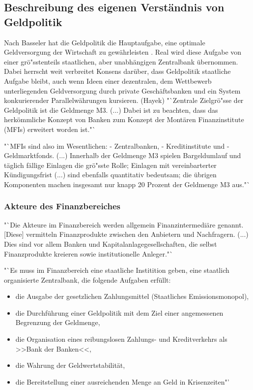 \documentclass[
        onecolumn,
        a4paper,
        abstracton,
        parskip=half
        ,final
        ]{scrartcl}
\begin{document}
\subsection{Beschreibung des eigenen Verst{\"a}ndnis von Geldpolitik}

    Nach Basseler hat die Geldpolitik die Hauptaufgabe, eine optimale Geldversorgung der Wirtschaft zu gew{\"a}hrleisten \citep[Vgl.][S. 551]{Basseler2010}.
    Real wird diese Aufgabe von einer gr{\"o}{"ss}tenteils staatlichen, aber unabh{\"a}ngigen Zentralbank {\"u}bernommen. Dabei herrscht weit verbreitet Konsens dar{\"u}ber, dass Geldpolitik staatliche Aufgabe bleibt, auch wenn Ideen einer dezentralen, dem Wettbewerb unterliegenden Geldversorgung durch private Gesch{\"a}ftsbanken und ein System konkurierender Parallelw{\"a}hrungen kursieren. (Hayek)
    "`Zentrale Zielgr{\"o}{"ss}e der Geldpolitik ist die Geldmenge M3. (...) Dabei ist zu beachten, dass das herk{\"o}mmliche Konzept von Banken zum Konzept der Mont{\"a}ren Finanzinstitute (MFIs) erweitert worden ist."`
    \citep[vgl.][S. 507]{Basseler2010}

    \citep[vgl.][S.508]{Basseler2010} "`MFIs sind also im Wesentlichen:
    - Zentralbanken,
    - Kreditinstitute und
    - Geldmarktfonds.
    (...) Innerhalb der Geldmenge M3 spielen Bargeldumlauf und t{\"a}glich f{\"a}llige Einlagen die gr{\"o}{"ss}te Rolle; Einlagen mit vereinbarterter K{\"u}ndigungsfrist (...) sind ebenfalls quantitativ bedeutsam; die {\"u}brigen Komponenten machen insgesamt nur knapp 20 Prozent der Geldmenge M3 aus."`


    \subsubsection{ Akteure des Finanzbereiches}

    \citep[vgl.][S.511f]{Basseler2010} "`Die Akteure im Finanzbereich werden allgemein Finanzintermedi{\"a}re genannt. [Diese] vermitteln Finanzprodukte zwischen den Anbietern und Nachfragern. (...) Dies sind vor allem Banken und Kapitalanlagegesellschaften, die selbst Finanzprodukte kreieren sowie institutionelle Anleger."`

     "`Es muss im Finanzbereich eine staatliche Institition geben, eine staatlich organisierte Zentralbank, die folgende Aufgaben erf{\"u}llt:
     \begin{itemize}
    \item{die Ausgabe der gesetzlichen Zahlungsmittel (Staatliches Emissionsmonopol),}
    \item{die Durchf{\"u}hrung einer Geldpolitik mit dem Ziel einer angemessenen Begrenzung der Geldmenge,}
    \item{die Organisation eines reibungslosen Zahlungs- und Kreditverkehrs als >>Bank der Banken<<,}
    \item{die Wahrung der Geldwertstabilit{\"a}t,}
    \item{die Bereitstellung einer ausreichenden Menge an Geld in Krisenzeiten"'}
    \end{itemize}
\end{document}
